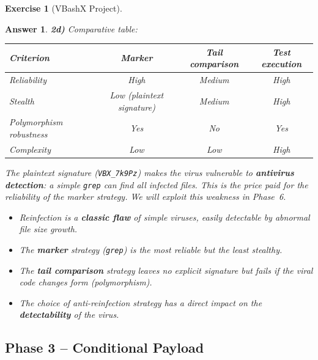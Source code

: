 \documentclass[a4paper,11pt]{article}
\theoremstyle{plain}
\newtheorem{correction}{Answer}
\theoremstyle{definition}
\newtheorem{exercice}{Exercise}
\begin{document}
\begin{exercice}[VBashX Project]
\begin{correction}
\textbf{2d)} Comparative table:
\begin{center}
\begin{tabular}{lccc}
\toprule
\textbf{Criterion} & \textbf{Marker} & \textbf{Tail comparison} & \textbf{Test execution} \\
\midrule
Reliability & High & Medium & High \\
Stealth & Low (plaintext signature) & Medium & High \\
Polymorphism robustness & Yes & No & Yes \\
Complexity & Low & Low & High \\
\bottomrule
\end{tabular}
\end{center}

\begin{attention}
The plaintext signature (\texttt{VBX\_7k9Pz}) makes the virus vulnerable to \textbf{antivirus detection}: a simple \texttt{grep} can find all infected files. This is the price paid for the reliability of the marker strategy. We will exploit this weakness in Phase~6.
\end{attention}

\begin{pointcle}
\begin{itemize}
    \item Reinfection is a \textbf{classic flaw} of simple viruses, easily detectable by abnormal file size growth.
    \item The \textbf{marker} strategy (\texttt{grep}) is the most reliable but the least stealthy.
    \item The \textbf{tail comparison} strategy leaves no explicit signature but fails if the viral code changes form (polymorphism).
    \item The choice of anti-reinfection strategy has a direct impact on the \textbf{detectability} of the virus.
\end{itemize}
\end{pointcle}

\end{correction}



\subsection*{Phase 3 -- Conditional Payload}


\end{exercice}
\end{document}
